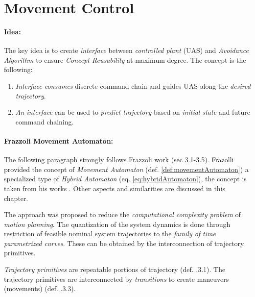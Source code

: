 \section{Movement Control}\label{s:movementAutomatonTheory}

\paragraph{Idea:} The key idea is to create \emph{interface} between \emph{controlled plant} (UAS) and \emph{Avoidance Algorithm} to ensure \emph{Concept Reusability} at maximum degree.  The concept is the following:

\begin{enumerate}

    \item \emph{Interface consumes} discrete command chain and guides UAS along the \emph{desired trajectory}.
    
    \item \emph{An interface} can be used to \emph{predict trajectory} based on \emph{initial state} and future command chaining. 
\end{enumerate}


\paragraph{Frazzoli Movement Automaton:} The following paragraph strongly follows Frazzoli work \cite{frazzoli2001robust} (sec 3.1-3.5). Frazolli provided the concept of \emph{Movement Automaton} (def. \ref{def:movementAutomaton}) a specialized type of \emph{Hybrid Automaton} (eq. \ref{eq:hybridAutomaton}), the concept is taken from his works \cite{frazzoli2001robust,frazzoli2000trajectory}. Other aspects and similarities are discussed in this chapter. 


The approach was proposed to reduce the \emph{computational complexity problem} of \emph{motion planning}. The quantization of the system dynamics is done through restriction of feasible nominal system trajectories to the \emph{family of time parametrized curves}. These can be obtained by the interconnection of trajectory primitives.

\emph{Trajectory primitives} are repeatable portions of trajectory (def. \cite{frazzoli2001robust}.3.1). The trajectory primitives are interconnected by \emph{transitions} to create maneuvers (movements) (def. \cite{frazzoli2001robust}.3.3). 

